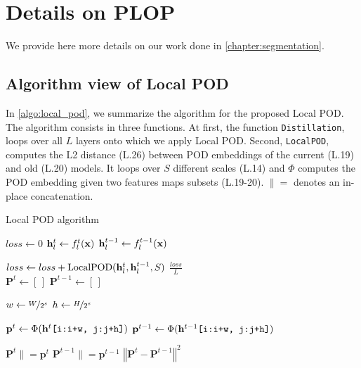 \section{Details on PLOP}
\label{sec:appendix_plop}

We provide here more details on our work done in \autoref{chapter:segmentation}.

\subsection{Algorithm view of Local POD}

In \autoref{algo:local_pod}, we summarize the algorithm for the proposed Local POD. The algorithm
consists in three functions. At first, the function \texttt{Distillation}, loops over all $L$ layers
onto which we apply Local POD. Second, \texttt{LocalPOD}, computes the L2 distance (L.26) between
POD embeddings of the current (L.19) and old (L.20) models. It loops over $S$ different scales
(L.14) and $\Phi$ computes the POD embedding given two features maps subsets (L.19-20). $\|=$
denotes an in-place concatenation.

\begin{algorithm}
    \caption{Local POD algorithm}
    \label{algo:local_pod}
    \begin{algorithmic}[1]
         \State $loss \gets 0$  \State $\mathbf{h}^t_l \gets f^t_l(\mathbf{x})$ \State $\mathbf{h}^{t-1}_l \gets
            f^{t-1}_l(\mathbf{x})$

        \State $loss \gets loss + \operatorname{LocalPOD}(\mathbf{h}^t_l, \mathbf{h}^{t-1}_l, S)$ \EndFor \State
        \Return $\frac{loss}{L}$ \EndFunction \\
         \State $\mathbf{P}^t \gets [\,]$ \State
        $\mathbf{P}^{t-1} \gets [\,]$

          \State $w \gets
            \nicefrac{W}{2^s}$ \State $h \gets \nicefrac{H}{2^s}$

          \State $\mathbf{p}^t \gets \operatorname{\Phi}(\mathbf{h}^t\texttt{[i:i+w, j:j+h]})$
        \State $\mathbf{p}^{t-1} \gets \operatorname{\Phi}(\mathbf{h}^{t-1}\texttt{[i:i+w,
                j:j+h]})$

        \State $\mathbf{P}^t \|= \mathbf{p}^t$ \State $\mathbf{P}^{t-1} \|= \mathbf{p}^{t-1}$ \EndFor \EndFor
        \EndFor \State \Return $\left\Vert \mathbf{P}^t - \mathbf{P}^{t-1}\right\Vert^2$
        \EndFunction
    \end{algorithmic}
\end{algorithm}

